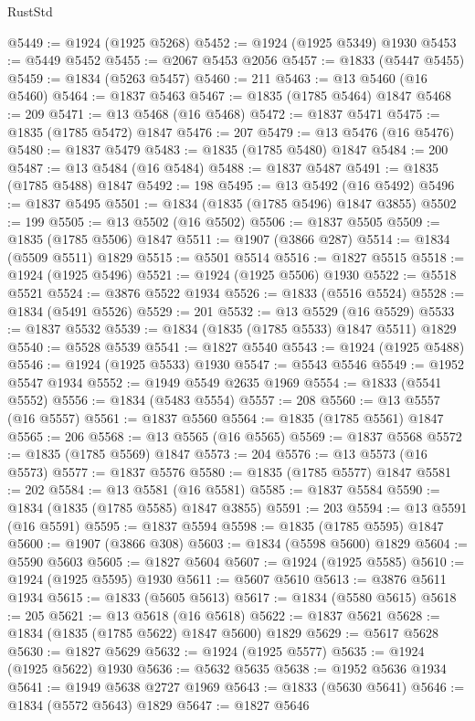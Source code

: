 \begin{lexlean}{RustStd}
\begin{coremodule}
@5449 := @1924 (@1925 @5268)
@5452 := @1924 (@1925 @5349) @1930
@5453 := @5449 @5452
@5455 := @2067 @5453 @2056
@5457 := @1833 (@5447 @5455)
@5459 := @1834 (@5263 @5457)
@5460 := 211
@5463 := @13 @5460 (@16 @5460)
@5464 := @1837 @5463
@5467 := @1835 (@1785 @5464) @1847
@5468 := 209
@5471 := @13 @5468 (@16 @5468)
@5472 := @1837 @5471
@5475 := @1835 (@1785 @5472) @1847
@5476 := 207
@5479 := @13 @5476 (@16 @5476)
@5480 := @1837 @5479
@5483 := @1835 (@1785 @5480) @1847
@5484 := 200
@5487 := @13 @5484 (@16 @5484)
@5488 := @1837 @5487
@5491 := @1835 (@1785 @5488) @1847
@5492 := 198
@5495 := @13 @5492 (@16 @5492)
@5496 := @1837 @5495
@5501 := @1834 (@1835 (@1785 @5496) @1847 @3855)
@5502 := 199
@5505 := @13 @5502 (@16 @5502)
@5506 := @1837 @5505
@5509 := @1835 (@1785 @5506) @1847
@5511 := @1907 (@3866 @287)
@5514 := @1834 (@5509 @5511) @1829
@5515 := @5501 @5514
@5516 := @1827 @5515
@5518 := @1924 (@1925 @5496)
@5521 := @1924 (@1925 @5506) @1930
@5522 := @5518 @5521
@5524 := @3876 @5522 @1934
@5526 := @1833 (@5516 @5524)
@5528 := @1834 (@5491 @5526)
@5529 := 201
@5532 := @13 @5529 (@16 @5529)
@5533 := @1837 @5532
@5539 := @1834 (@1835 (@1785 @5533) @1847 @5511) @1829
@5540 := @5528 @5539
@5541 := @1827 @5540
@5543 := @1924 (@1925 @5488)
@5546 := @1924 (@1925 @5533) @1930
@5547 := @5543 @5546
@5549 := @1952 @5547 @1934
@5552 := @1949 @5549 @2635 @1969
@5554 := @1833 (@5541 @5552)
@5556 := @1834 (@5483 @5554)
@5557 := 208
@5560 := @13 @5557 (@16 @5557)
@5561 := @1837 @5560
@5564 := @1835 (@1785 @5561) @1847
@5565 := 206
@5568 := @13 @5565 (@16 @5565)
@5569 := @1837 @5568
@5572 := @1835 (@1785 @5569) @1847
@5573 := 204
@5576 := @13 @5573 (@16 @5573)
@5577 := @1837 @5576
@5580 := @1835 (@1785 @5577) @1847
@5581 := 202
@5584 := @13 @5581 (@16 @5581)
@5585 := @1837 @5584
@5590 := @1834 (@1835 (@1785 @5585) @1847 @3855)
@5591 := 203
@5594 := @13 @5591 (@16 @5591)
@5595 := @1837 @5594
@5598 := @1835 (@1785 @5595) @1847
@5600 := @1907 (@3866 @308)
@5603 := @1834 (@5598 @5600) @1829
@5604 := @5590 @5603
@5605 := @1827 @5604
@5607 := @1924 (@1925 @5585)
@5610 := @1924 (@1925 @5595) @1930
@5611 := @5607 @5610
@5613 := @3876 @5611 @1934
@5615 := @1833 (@5605 @5613)
@5617 := @1834 (@5580 @5615)
@5618 := 205
@5621 := @13 @5618 (@16 @5618)
@5622 := @1837 @5621
@5628 := @1834 (@1835 (@1785 @5622) @1847 @5600) @1829
@5629 := @5617 @5628
@5630 := @1827 @5629
@5632 := @1924 (@1925 @5577)
@5635 := @1924 (@1925 @5622) @1930
@5636 := @5632 @5635
@5638 := @1952 @5636 @1934
@5641 := @1949 @5638 @2727 @1969
@5643 := @1833 (@5630 @5641)
@5646 := @1834 (@5572 @5643) @1829
@5647 := @1827 @5646

\end{coremodule}
\end{lexlean}
